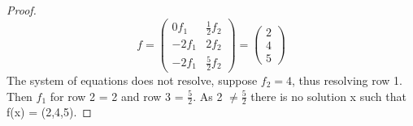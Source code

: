 \documentclass[11pt,nocut]{article}
\begin{document}
\begin{problem}[3 points]
\begin{enumerate}[label=\normalfont(\textbf{\alph*})]
\begin{proof}
		$$ f = 
			\begin{pmatrix}
			0 f_1& \frac{1}{2}f_2\\
			-2 f_1& 2f_2\\
			-2 f_1& \frac{5}{2}f_2
			\end{pmatrix}
		=
			\begin{pmatrix}
			2\\
			4\\
			5
			\end{pmatrix}
		$$
		The system of equations does not resolve, suppose $f_2 = 4$, thus resolving row 1. Then $f_1$ for row 2 = 2 and row 3 = $\frac{5}{2}$. As 2 $\neq \frac{5}{2}$ there is no solution x such that f(x) = (2,4,5).
		\end{proof}
	\end{enumerate}
\end{problem}
\vspace{5mm}
\end{document}
